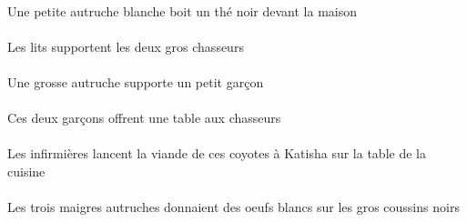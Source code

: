 \begin{exe}
\INDSgErgP{}   \petitDSgP{}   \blancDSgP{}   \autrucheDSgErgP{}    \DEFSgOblP{}   \maisonDSgOblP{}   \DEVANTP{}   \INDSgAbsP{}   \noirBSgP{}   \theBSgAbsP{}  \boireVtPrsBSgP{}\\
Une petite autruche blanche boit un thé noir devant la maison
\ex\gll
\DEFPlErg{}   \litDPlErg{}   \DEFDuAbs{}   \grosCDu{}   \chasseurCDuAbs{}  \supporterVtPrsCDu{}\\
\DEFPlErgP{}   \litDPlErgP{}   \DEFDuAbsP{}   \grosCDuP{}   \chasseurCDuAbsP{}  \supporterVtPrsCDuP{}\\
Les lits supportent les deux gros chasseurs
\ex\gll
\INDSgErg{}   \grosDSg{}   \autrucheDSgErg{}   \INDSgAbs{}   \petitBSg{}   \garconBSgAbs{}  \supporterVtPrsBSg{}\\
\INDSgErgP{}   \grosDSgP{}   \autrucheDSgErgP{}   \INDSgAbsP{}   \petitBSgP{}   \garconBSgAbsP{}  \supporterVtPrsBSgP{}\\
Une grosse autruche supporte un petit garçon
\ex\gll
\DEMDuErg{}   \garconBDuErg{}    \DEFPlDat{}   \chasseurCPlDat{}   \INDSgAbs{}   \tableCSgAbs{}  \offrirVdPrsCSg{}\\
\DEMDuErgP{}   \garconBDuErgP{}    \DEFPlDatP{}   \chasseurCPlDatP{}   \INDSgAbsP{}   \tableCSgAbsP{}  \offrirVdPrsCSgP{}\\
Ces deux garçons offrent une table aux chasseurs
\ex\gll
\DEFSgObl{}    \DEFSgObl{}   \cuisineCSgObl{}   \DE{}   \tableCSgObl{}   \SUR{}   \DEFPlErg{}   \infirmiereBPlErg{}    \INDSgDat{}   \KatishaASgDat{}   \DEFSgAbs{}    \DEMPlObl{}   \coyoteAPlObl{}   \DE{}   \viandeASgAbs{}  \lancerVdPrsASg{}\\
\DEFSgOblP{}    \DEFSgOblP{}   \cuisineCSgOblP{}   \DEP{}   \tableCSgOblP{}   \SURP{}   \DEFPlErgP{}   \infirmiereBPlErgP{}    \INDSgDatP{}   \KatishaASgDatP{}   \DEFSgAbsP{}    \DEMPlOblP{}   \coyoteAPlOblP{}   \DEP{}   \viandeASgAbsP{}  \lancerVdPrsASgP{}\\
Les infirmières lancent la viande de ces coyotes à Katisha sur la table de la cuisine
\ex\gll
\DEFPlObl{}   \grosAPl{}   \noirAPl{}   \coussinAPlObl{}   \SUR{}   \DEFPlErg{}   \troisDPl{}   \maigreDPl{}   \autrucheDPlErg{}   \INDPlAbs{}   \blancDPl{}   \oeufDPlAbs{}  \donnerVdPstDPl{}\\
\DEFPlOblP{}   \grosAPlP{}   \noirAPlP{}   \coussinAPlOblP{}   \SURP{}   \DEFPlErgP{}   \troisDPlP{}   \maigreDPlP{}   \autrucheDPlErgP{}   \INDPlAbsP{}   \blancDPlP{}   \oeufDPlAbsP{}  \donnerVdPstDPlP{}\\
Les trois maigres autruches donnaient des oeufs blancs sur les gros coussins noirs

\end{exe}

